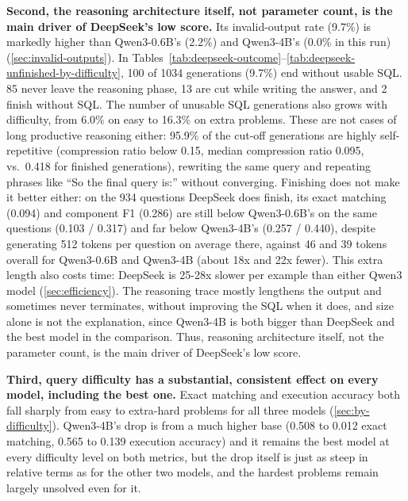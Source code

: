 \textbf{Second, the reasoning architecture itself, not parameter count, is the main driver of DeepSeek's low score.} Its invalid-output rate (9.7\%) is markedly higher than Qwen3-0.6B's (2.2\%) and Qwen3-4B's (0.0\% in this run) (\ref{sec:invalid-outputs}). In Tables~\ref{tab:deepseek-outcome}--\ref{tab:deepseek-unfinished-by-difficulty}, 100 of 1034 generations (9.7\%) end without usable SQL. 85 never leave the reasoning phase, 13 are cut while writing the answer, and 2 finish without SQL. The number of unusable SQL generations also grows with difficulty, from 6.0\% on easy to 16.3\% on extra problems. These are not cases of long productive reasoning either: 95.9\% of the cut-off generations are highly self-repetitive (compression ratio below 0.15, median compression ratio 0.095, vs.\ 0.418 for finished generations), rewriting the same query and repeating phrases like ``So the final query is:'' without converging. Finishing does not make it better either: on the 934 questions DeepSeek does finish, its exact matching (0.094) and component F1 (0.286) are still below Qwen3-0.6B's on the same questions (0.103 / 0.317) and far below Qwen3-4B's (0.257 / 0.440), despite generating 512 tokens per question on average there, against 46 and 39 tokens overall for Qwen3-0.6B and Qwen3-4B (about 18x and 22x fewer). This extra length also costs time: DeepSeek is 25-28x slower per example than either Qwen3 model (\ref{sec:efficiency}). The reasoning trace mostly lengthens the output and sometimes never terminates, without improving the SQL when it does, and size alone is not the explanation, since Qwen3-4B is both bigger than DeepSeek and the best model in the comparison. Thus, reasoning architecture itself, not the parameter count, is the main driver of DeepSeek's low score.

\textbf{Third, query difficulty has a substantial, consistent effect on every model, including the best one.} Exact matching and execution accuracy both fall sharply from easy to extra-hard problems for all three models (\ref{sec:by-difficulty}). Qwen3-4B's drop is from a much higher base (0.508 to 0.012 exact matching, 0.565 to 0.139 execution accuracy) and it remains the best model at every difficulty level on both metrics, but the drop itself is just as steep in relative terms as for the other two models, and the hardest problems remain largely unsolved even for it.

